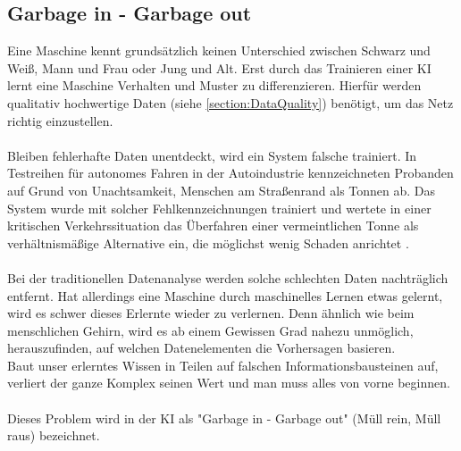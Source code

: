 \documentclass[12pt,oneside,a4paper,parskip]{scrbook}
\begin{document}
\subsection{Garbage in - Garbage out}
\label{section:DataGarbage}
Eine Maschine kennt grundsätzlich keinen Unterschied zwischen Schwarz und Weiß, Mann und Frau oder Jung und Alt. Erst durch das Trainieren einer KI lernt eine Maschine Verhalten und Muster zu differenzieren. Hierfür werden qualitativ hochwertige Daten (siehe \ref{section:DataQuality}) benötigt, um das Netz richtig einzustellen.
\\\\
Bleiben fehlerhafte Daten unentdeckt, wird ein System falsche trainiert. In Testreihen für autonomes Fahren in der Autoindustrie kennzeichneten Probanden auf Grund von Unachtsamkeit, Menschen am Straßenrand als Tonnen ab. Das System wurde mit solcher Fehlkennzeichnungen trainiert und wertete in einer kritischen Verkehrssituation das Überfahren einer vermeintlichen Tonne als verhältnismäßige Alternative ein, die möglichst wenig Schaden anrichtet \cite{trainingsDataKI}.
\\\\
Bei der traditionellen Datenanalyse werden solche schlechten Daten nachträglich entfernt. Hat allerdings eine Maschine durch maschinelles Lernen etwas gelernt, wird es schwer dieses Erlernte wieder zu verlernen. Denn ähnlich wie beim menschlichen Gehirn, wird es ab einem Gewissen Grad nahezu unmöglich, herauszufinden, auf welchen Datenelementen die Vorhersagen basieren.\\
Baut unser erlerntes Wissen in Teilen auf falschen Informationsbausteinen auf, verliert der ganze Komplex seinen Wert und man muss alles von vorne beginnen.
\\\\
Dieses Problem wird in der KI als "Garbage in - Garbage out" (Müll rein, Müll raus) bezeichnet.
\end{document}
